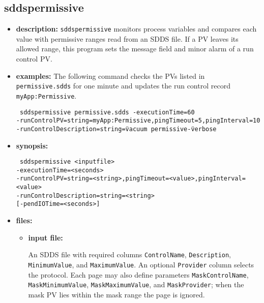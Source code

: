 %
%
\begin{latexonly}
\newpage
\end{latexonly}

\subsection{sddspermissive}
\label{sddspermissive}

\begin{itemize}
\item {\bf description:}
\verb+sddspermissive+ monitors process variables and compares each value with
permissive ranges read from an SDDS file.  If a PV leaves its allowed range,
this program sets the message field and minor alarm of a run control PV.

\item {\bf examples:}
The following command checks the PVs listed in \verb+permissive.sdds+ for one
minute and updates the run control record \verb+myApp:Permissive+.
\begin{flushleft}{\tt
sddspermissive permissive.sdds -executionTime=60\\
  -runControlPV=string=myApp:Permissive,pingTimeout=5,pingInterval=10\\
  -runControlDescription=string=\"vacuum permissive\" -verbose
}\end{flushleft}

\item {\bf synopsis:}
\begin{flushleft}{\tt
sddspermissive <inputfile>\\
 -executionTime=<seconds>\\
 -runControlPV=string=<string>,pingTimeout=<value>,pingInterval=<value>\\
 -runControlDescription=string=<string>\\
[-verbose] [-pendIOTime=<seconds>]
}\end{flushleft}

\item {\bf files:}
\begin{itemize}
\item {\bf input file:}\par
An SDDS file with required columns \verb+ControlName+, \verb+Description+,
\verb+MinimumValue+, and \verb+MaximumValue+.  An optional \verb+Provider+
column selects the protocol.  Each page may also define parameters
\verb+MaskControlName+, \verb+MaskMinimumValue+, \verb+MaskMaximumValue+,
and \verb+MaskProvider+; when the mask PV lies within the mask range the page
is ignored.
\end{itemize}


\end{itemize}
